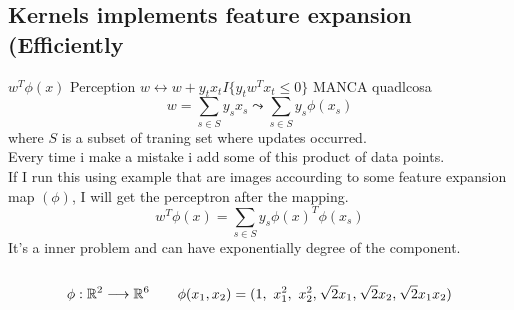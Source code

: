 \documentclass[../main.tex]{subfiles}
\begin{document}
\subsection{Kernels implements feature expansion (Efficiently}

$ w^T \phi(x) $ \quad Perception $ w \leftrightarrow w + y_t x_t I \{y_t w^T x_t \leq 0 \} $ MANCA quadlcosa
\\
$$
w = \sum_{s\in S} y_s x_s \leadsto \sum_{s \in S} y_s \phi (x_s) 
$$ 
where $S$ is a subset of traning set where updates occurred.
\\
Every time i make a mistake i add some of this product of data points. \\
If I run this using example that are images accourding to some feature expansion map $(\phi)$, I will get the perceptron after the mapping.
$$
w^T \phi(x) = \sum_{s \in S} y_s \phi(x)^T \phi(x_s)
$$
It's a inner problem and can have exponentially degree of the component.
\\
\\
$$
\phi: \mathbb{R}^2 \longrightarrow \mathbb{R}^6 \qquad \phi(x_1,x_2) = (1, \ x_1^2, \ x_2^2, \ \sqrt[]{2} x_1, \ \sqrt[]{2} x_2, \ \sqrt[]{2} x_1 x_2)
$$
\end{document}
